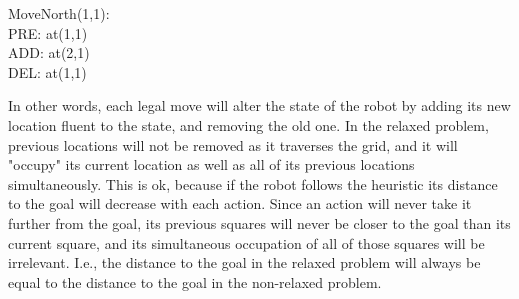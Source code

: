 \documentclass{article}
\begin{document}
\begin{enumerate}
MoveNorth(1,1):\\
PRE: at(1,1)\\
ADD: at(2,1)\\
DEL: at(1,1)

In other words, each legal move will alter the state of the robot by adding its
new location fluent to the state, and removing the old one. In the relaxed
problem, previous locations will not be removed as it
traverses the grid, and it will "occupy" its current location as well as all of
its previous locations simultaneously. This is ok, because if the robot follows
the heuristic its distance to the goal will decrease with each action.
Since an action will never take it further from the goal, its previous squares
will never be closer to the goal than its current square, and its simultaneous
occupation of all of those squares will be irrelevant. I.e., the distance to
the goal in the relaxed problem will always be equal to the distance to the
goal in the non-relaxed problem.

\end{enumerate}
\end{document}
